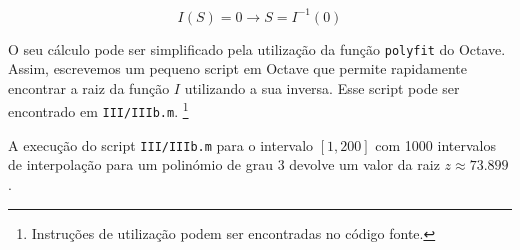 \documentclass[portuguese, a4paper]{article}
\newcommand\tu[0]{\textunderscore}
\begin{document}
		\begin{equation}
			I(S) = 0 \rightarrow S = I^{-1}(0)
		\end{equation}

		\par
		O seu cálculo pode ser simplificado pela utilização da função
		\texttt{polyfit} do Octave.  Assim, escrevemos um pequeno script em
		Octave que permite rapidamente encontrar a raiz da função $I$
		utilizando a sua inversa. Esse script pode ser encontrado em
		\texttt{III/III\tu b.m}. \footnote{Instruções de utilização podem ser
		encontradas no código fonte.}

		\par
		A execução do script \texttt{III/III\tu b.m} para o intervalo $[1, 200]$
		com 1000 intervalos de interpolação para um polinómio de grau 3 devolve
		um valor da raiz $z \approx 73.899$.





\end{document}
